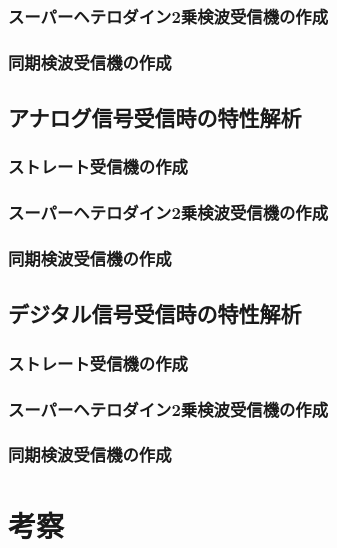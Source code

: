 \documentclass[11pt]{ltjsarticle}
\begin{document}
		\subsubsection{スーパーヘテロダイン2乗検波受信機の作成}
		\subsubsection{同期検波受信機の作成}
	\subsection{アナログ信号受信時の特性解析}
		\subsubsection{ストレート受信機の作成}
		\subsubsection{スーパーヘテロダイン2乗検波受信機の作成}
		\subsubsection{同期検波受信機の作成}
	\subsection{デジタル信号受信時の特性解析}
		\subsubsection{ストレート受信機の作成}
		\subsubsection{スーパーヘテロダイン2乗検波受信機の作成}
		\subsubsection{同期検波受信機の作成}
\section{考察}
		
\end{document}

